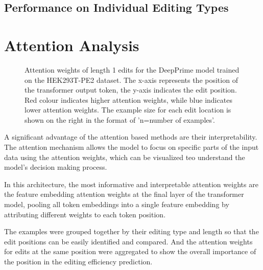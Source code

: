 \subsection{Performance on Individual Editing Types}

\section{Attention Analysis}
\label{sec:attention_analysis}

\begin{figure}
    \centering
    \caption[Attention weights for the DeepPrime model trained on the HEK293T-PE2 dataset]{Attention weights of length 1 edits for the DeepPrime model trained on the HEK293T-PE2 dataset. The x-axis represents the position of the transformer output token, the y-axis indicates the edit position. Red colour indicates higher attention weights, while blue indicates lower attention weights. The example size for each edit location is shown on the right in the format of 'n=number of examples'.}
    \label{fig:attention}
\end{figure}

A significant advantage of the attention based methods are their interpretability. The attention mechanism allows the model to focus on specific parts of the input data using the attention weights, which can be visualized teo understand the model's decision making process. 

In this architecture, the most informative and interpretable attention weights are the feature embedding attention weights at the final layer of the transformer model, pooling all token embeddings into a single feature embedding by attributing different weights to each token position. 

The examples were grouped together by their editing type and length so that the edit positions can be easily identified and compared. And the attention weights for edits at the same position were aggregated to show the overall importance of the position in the editing efficiency prediction.

